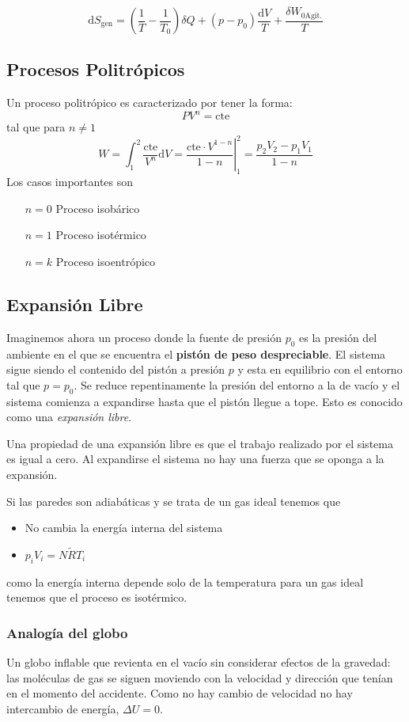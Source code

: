 \documentclass{article}
\newcommand{\cte}{\textrm{cte}}
\newcommand{\agitacion}{\textrm{Agit.}}
\newcommand{\Sgen}{S_{\textrm{gen}}}
\newcommand{\di}{\textrm{d}}
\begin{document}
\[
\di \Sgen = \left( \frac{1}{T}- \frac{1}{T_0}\right) \delta Q + (p-p_0)\frac{\di V}{T} + \frac{\delta W_{0\agitacion}}{T}
\]

\subsection{Procesos Politrópicos}
Un proceso politrópico es caracterizado por tener la forma:
\[
PV^n = \cte
\]
tal que para $n\neq 1$
\[
W= \int^2_1\frac{\cte}{V^n}\di V =\left. \frac{\cte \cdot V^{1-n}}{1-n}\right|_{1}^2 = \frac{p_2V_2-p_1V_1}{1-n}
\]
Los casos importantes son
\begin{itemize}
    \item[$n=0$] Proceso isobárico
    \item[$n=1$] Proceso isotérmico
    \item[$n=k$] Proceso isoentrópico
\end{itemize}
\clearpage

\subsection{Expansión Libre} \label{sec:expansionlibre}
Imaginemos ahora un proceso donde la fuente de presión $p_0$ es la presión del ambiente en el que se encuentra el \textbf{pistón de peso despreciable}. El sistema sigue siendo el contenido del pistón a presión $p$ y esta en equilibrio con el entorno tal que $p=p_0$. Se reduce repentinamente la presión del entorno a la de vacío y el sistema comienza a expandirse hasta que el pistón llegue a tope. Esto es conocido como una \textit{expansión libre}. 

Una propiedad de una expansión libre es que el trabajo realizado por el sistema es igual a cero. Al expandirse el sistema no hay una fuerza que se oponga a la expansión. 

Si las paredes son adiabáticas y se trata de un gas ideal tenemos que 
\begin{itemize}
    \item No cambia la energía interna del sistema
    \item $p_i V_i=N\tilde{R}T_i$
\end{itemize}
como la energía interna depende solo de la temperatura para un gas ideal tenemos que el proceso es isotérmico.

\subsubsection*{Analogía del globo}
Un globo inflable que revienta en el vacío sin considerar efectos de la gravedad: las moléculas de gas se siguen moviendo con la velocidad y dirección que tenían en el momento del accidente. Como no hay cambio de velocidad no hay intercambio de energía, $\Delta U=0$.
\end{document}

